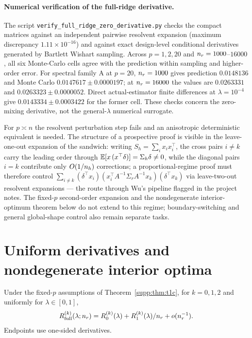 \paragraph{Numerical verification of the full-ridge derivative.}
The script \texttt{verify\_full\_ridge\_zero\_derivative.py} checks the compact matrices against an independent pairwise resolvent expansion (maximum discrepancy $1.11\times10^{-16}$) and against exact design-level conditional derivatives generated by Bartlett Wishart sampling. Across $p=1,2,20$ and $n_r=1000$--$16000$, all six Monte-Carlo cells agree with the prediction within sampling and higher-order error. For spectral family A at $p=20$, $n_r=1000$ gives prediction $0.0148136$ and Monte Carlo $0.0147617\pm0.0000197$; at $n_r=16000$ the values are $0.0263331$ and $0.0263323\pm0.0000052$. Direct actual-estimator finite differences at $\lambda=10^{-4}$ give $0.0143334\pm0.0003422$ for the former cell. These checks concern the zero-mixing derivative, not the general-$\lambda$ numerical surrogate.

\begin{remark}
For $p \asymp n$ the resolvent perturbation step fails and an anisotropic deterministic equivalent is needed.
The structure of a prospective proof is visible in the leave-one-out expansion of the sandwich: writing $S_h = \sum_i x_i x_i^\top$, the cross pairs $i \neq k$ carry the leading order through $\mathbb{E}[x\,(x^\top\delta)] = \Sigma_h\delta \neq 0$, while the diagonal pairs $i = k$ contribute only $O(1/n_h)$ corrections; a proportional-regime proof must therefore control $\sum_{i \neq k} (\delta^\top x_i)(x_i^\top A^{-1}\Sigma_r A^{-1} x_k)(\delta^\top x_k)$ via leave-two-out resolvent expansions --- the route through Wu's pipeline flagged in the project notes.
The fixed-$p$ second-order expansion and the nondegenerate interior-optimum theorem below do not extend to this regime; boundary-switching and general global-shape control also remain separate tasks.
\end{remark}

\section{Uniform derivatives and nondegenerate interior optima}
\label{supp:optfull}

\begin{theorem}\label{supp:thm:derivatives}
Under the fixed-$p$ assumptions of Theorem~\ref{supp:thm:t1c}, for $k=0,1,2$ and uniformly for $\lambda\in[0,1]$,
\begin{equation}
 R_{\mathrm{full}}^{(k)}(\lambda;n_r)
 =R_0^{(k)}(\lambda)+R_1^{(k)}(\lambda)/n_r+o(n_r^{-1}).
\end{equation}
Endpoints use one-sided derivatives.
\end{theorem}

